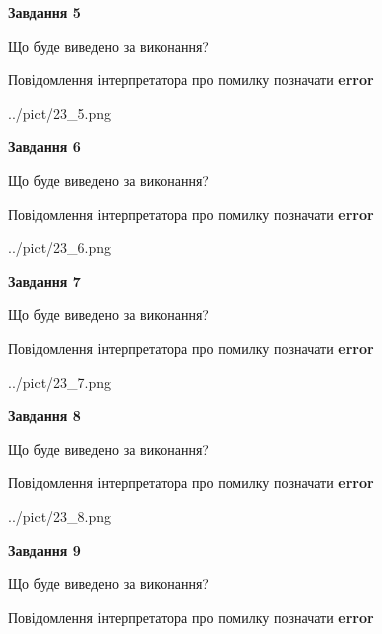 \documentclass[11pt, ukrainian]{article}
\begin{document}
{\begin {large}
{\begin {center}\textbf{Завдання 5}\end {center}}\par
Що буде виведено за виконання? \par
Повідомлення інтерпретатора про помилку позначати \textbf{error}

\begin{center}
	{../pict/23_5.png}
\end{center}
\newpage

{\begin {center}\textbf{Завдання 6}\end {center}}\par
Що буде виведено за виконання? \par
Повідомлення інтерпретатора про помилку позначати \textbf{error}

\begin{center}
	{../pict/23_6.png}
\end{center}
\newpage

{\begin {center}\textbf{Завдання 7}\end {center}}\par
Що буде виведено за виконання? \par
Повідомлення інтерпретатора про помилку позначати \textbf{error}

\begin{center}
	{../pict/23_7.png}
\end{center}
\newpage

{\begin {center}\textbf{Завдання 8}\end {center}}\par
Що буде виведено за виконання? \par
Повідомлення інтерпретатора про помилку позначати \textbf{error}

\begin{center}
	{../pict/23_8.png}
\end{center}
\newpage

{\begin {center}\textbf{Завдання 9}\end {center}}\par
Що буде виведено за виконання? \par
Повідомлення інтерпретатора про помилку позначати \textbf{error}


\end{large}}
\end{document}
